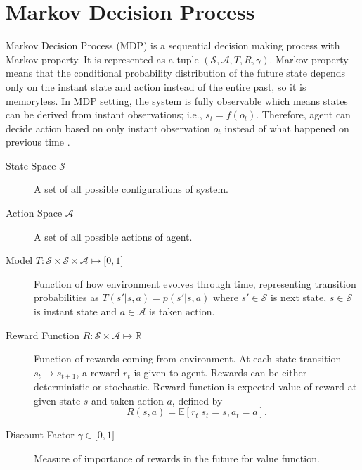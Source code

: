 \section{Markov Decision Process}
\label{sec:mdp}

Markov Decision Process (MDP) is a sequential decision making process with Markov property. 
It is represented as a tuple $(\mathcal{S},\mathcal{A},T,R,\gamma)$. 
Markov property means that the conditional probability distribution of the future state depends only on the instant state and action instead of the entire past, so it is memoryless. 
In MDP setting, the system is fully observable which means states can be derived from instant observations; i.e., $s_t=f(o_t)$. 
Therefore, agent can decide action based on only instant observation $o_t$ instead of what happened on previous time \cite{francois-lavet_introduction_2018}. 

\begin{description}
	\item[State Space $\mathcal{S}$] A set of all possible configurations of system. 
	
	\item[Action Space $\mathcal{A}$]  A set of all possible actions of agent. 
	
	\item[Model $T \colon \mathcal{S} \times \mathcal{S} \times \mathcal{A} \mapsto \lbrack 0,1 \rbrack$] Function of how environment evolves through time, representing transition probabilities as $T(s'|s,a) = p(s'|s,a)$ 
	where $s' \in \mathcal{S}$ is next state, $s \in \mathcal{S}$ is instant state and $a \in \mathcal{A}$ is taken action.
	
	\item[Reward Function $R \colon \mathcal{S} \times \mathcal{A} \mapsto \mathbb{R}$] Function of rewards coming from environment. 
	At each state transition $s_t \rightarrow s_{t+1}$, a reward $r_t$ is given to agent. 
	Rewards can be either deterministic or stochastic. 
	Reward function is expected value of reward at given state $s$ and taken action $a$, defined by 
	\begin{equation}
	R(s,a) = \mathbb{E}[r_t|s_t=s, a_t=a]. %
	\end{equation}
	
	\item[Discount Factor $\gamma \in \lbrack 0,1 \rbrack$] Measure of importance of rewards in the future for value function.
\end{description}
